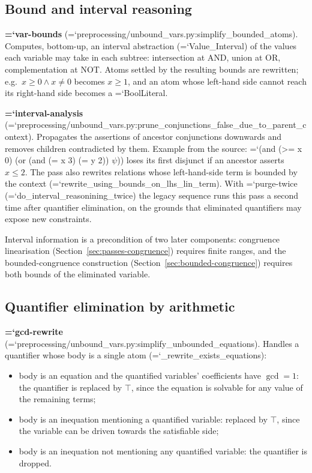 \documentclass[10pt,a4paper]{article}
\newcommand{\code}[1]{{\small\ttfamily\hyphenchar\font=`\-\relax #1}}
\begin{document}
\subsection{Bound and interval reasoning}

\textbf{\code{var-bounds}} (\code{preprocessing/unbound\_\allowbreak vars.py:\allowbreak simplify\_\allowbreak bounded\_\allowbreak atoms}).
Computes, bottom-up, an interval abstraction (\code{Value\_Interval}) of the values each variable may
take in each subtree: intersection at AND, union at OR, complementation at NOT.  Atoms settled by the
resulting bounds are rewritten; e.g.\ $x \geq 0 \wedge x \neq 0$ becomes $x \geq 1$, and an atom whose
left-hand side cannot reach its right-hand side becomes a \code{BoolLiteral}.

\textbf{\code{interval-analysis}}
(\code{preprocessing/unbound\_\allowbreak vars.py:\allowbreak prune\_\allowbreak conjunctions\_\allowbreak false\_\allowbreak due\_\allowbreak to\_\allowbreak parent\_\allowbreak context}).
Propagates the assertions of ancestor conjunctions downwards and removes children contradicted by
them.  Example from the source:
\code{(and (>= x 0) (or (and (= x 3) (= y 2)) $\psi$))} loses its first disjunct if an ancestor asserts
$x \leq 2$.  The pass also rewrites relations whose left-hand-side term is bounded by the context
(\code{rewrite\_\allowbreak using\_\allowbreak bounds\_\allowbreak on\_\allowbreak lhs\_\allowbreak lin\_\allowbreak term}).  With \code{purge-twice}
(\code{do\_interval\_reasonining\_twice}) the legacy sequence runs this pass a second time after
quantifier elimination, on the grounds that eliminated quantifiers may expose new constraints.

Interval information is a precondition of two later components: congruence linearisation
(Section~\ref{sec:passes-congruence}) requires finite ranges, and the bounded-congruence construction
(Section~\ref{sec:bounded-congruence}) requires both bounds of the eliminated variable.

\subsection{Quantifier elimination by arithmetic}

\textbf{\code{gcd-rewrite}} (\code{preprocessing/unbound\_\allowbreak vars.py:\allowbreak simplify\_\allowbreak unbounded\_\allowbreak equations}).
Handles a quantifier whose body is a single atom
(\code{\_rewrite\_exists\_equations}):

\begin{itemize}
  \item body is an equation and the quantified variables' coefficients have $\gcd = 1$: the quantifier
        is replaced by $\top$, since the equation is solvable for any value of the remaining terms;
  \item body is an inequation mentioning a quantified variable: replaced by $\top$, since the variable
        can be driven towards the satisfiable side;
  \item body is an inequation not mentioning any quantified variable: the quantifier is dropped.
\end{itemize}
\end{document}
